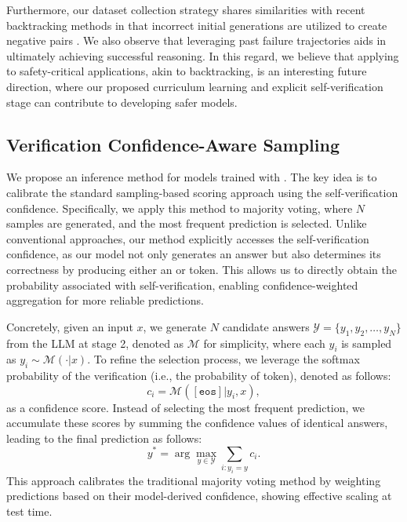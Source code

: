Furthermore, our dataset collection strategy shares similarities with recent backtracking methods in that incorrect initial generations are utilized to create negative pairs \citep{zhang2024backtracking}. We also observe that leveraging past failure trajectories aids in ultimately achieving successful reasoning. In this regard, we believe that applying \sname to safety-critical applications, akin to backtracking, is an interesting future direction, where our proposed curriculum learning and explicit self-verification stage can contribute to developing safer models.


\subsection{Verification Confidence-Aware Sampling}
\label{sec:method_scale}

We propose an inference method for models trained with \sname. The key idea is to calibrate the standard sampling-based scoring approach using the self-verification confidence. Specifically, we apply this method to majority voting, where $N$ samples are generated, and the most frequent prediction is selected. Unlike conventional approaches, our method explicitly accesses the self-verification confidence, as our model not only generates an answer but also determines its correctness by producing either an \eos or \rethink token. This allows us to directly obtain the probability associated with self-verification, enabling confidence-weighted aggregation for more reliable predictions.



Concretely, given an input $x$, we generate $N$ candidate answers $\mathcal{Y} = \{y_1, y_2, \dots, y_N\}$ from the LLM at stage 2, denoted as $\mathcal{M}$ for simplicity, where each $y_i$ is sampled as $y_i \sim \mathcal{M}(\cdot | x)$. To refine the selection process, we leverage the softmax probability of the verification (i.e., the probability of \eos token), denoted as follows:  
\[
c_i = \mathcal{M}([\mathtt{eos}] | y_i, x),
\]  
as a confidence score. Instead of selecting the most frequent prediction, we accumulate these scores by summing the confidence values of identical answers, leading to the final prediction as follows:  
\[
y^* = \arg\max_{y \in \mathcal{Y}} \sum_{i: y_i = y} c_i.
\]  
This approach calibrates the traditional majority voting method by weighting predictions based on their model-derived confidence, showing effective scaling at test time.





